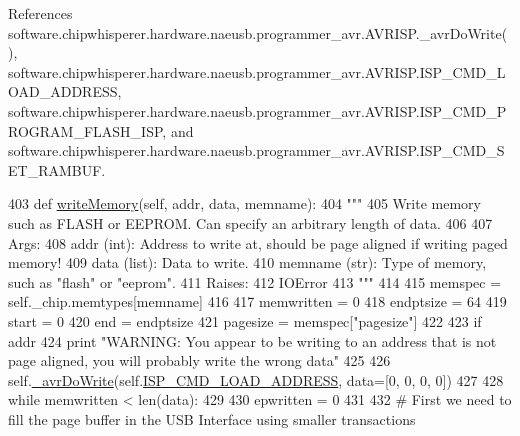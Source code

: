 References software.\+chipwhisperer.\+hardware.\+naeusb.\+programmer\+\_\+avr.\+A\+V\+R\+I\+S\+P.\+\_\+avr\+Do\+Write(), software.\+chipwhisperer.\+hardware.\+naeusb.\+programmer\+\_\+avr.\+A\+V\+R\+I\+S\+P.\+I\+S\+P\+\_\+\+C\+M\+D\+\_\+\+L\+O\+A\+D\+\_\+\+A\+D\+D\+R\+E\+S\+S, software.\+chipwhisperer.\+hardware.\+naeusb.\+programmer\+\_\+avr.\+A\+V\+R\+I\+S\+P.\+I\+S\+P\+\_\+\+C\+M\+D\+\_\+\+P\+R\+O\+G\+R\+A\+M\+\_\+\+F\+L\+A\+S\+H\+\_\+\+I\+S\+P, and software.\+chipwhisperer.\+hardware.\+naeusb.\+programmer\+\_\+avr.\+A\+V\+R\+I\+S\+P.\+I\+S\+P\+\_\+\+C\+M\+D\+\_\+\+S\+E\+T\+\_\+\+R\+A\+M\+B\+U\+F.


\begin{DoxyCode}
403     \textcolor{keyword}{def }\hyperlink{classsoftware_1_1chipwhisperer_1_1hardware_1_1naeusb_1_1programmer__avr_1_1AVRISP_a23ee0a22ef4d2d8e2222b4d7d99f7481}{writeMemory}(self, addr, data, memname):
404         \textcolor{stringliteral}{"""}
405 \textcolor{stringliteral}{        Write memory such as FLASH or EEPROM. Can specify an arbitrary length of data.}
406 \textcolor{stringliteral}{}
407 \textcolor{stringliteral}{        Args:}
408 \textcolor{stringliteral}{            addr (int): Address to write at, should be page aligned if writing paged memory!}
409 \textcolor{stringliteral}{            data (list): Data to write.}
410 \textcolor{stringliteral}{            memname (str): Type of memory, such as "flash" or "eeprom".}
411 \textcolor{stringliteral}{        Raises:}
412 \textcolor{stringliteral}{            IOError}
413 \textcolor{stringliteral}{        """}
414 
415         memspec = self.\_chip.memtypes[memname]
416 
417         memwritten = 0
418         endptsize = 64
419         start = 0
420         end = endptsize
421         pagesize = memspec[\textcolor{stringliteral}{"pagesize"}]
422 
423         \textcolor{keywordflow}{if} addr %
424             \textcolor{keywordflow}{print} \textcolor{stringliteral}{"WARNING: You appear to be writing to an address that is not page aligned, you will
       probably write the wrong data"}
425 
426         self.\hyperlink{classsoftware_1_1chipwhisperer_1_1hardware_1_1naeusb_1_1programmer__avr_1_1AVRISP_a30dde10a2adaa31bbd912b53bce2b138}{\_avrDoWrite}(self.\hyperlink{classsoftware_1_1chipwhisperer_1_1hardware_1_1naeusb_1_1programmer__avr_1_1AVRISP_a67f5e35e8a1fe59396fc6fcace808c56}{ISP\_CMD\_LOAD\_ADDRESS}, data=[0, 0, 0, 0])
427 
428         \textcolor{keywordflow}{while} memwritten < len(data):
429 
430             epwritten = 0
431 
432             \textcolor{comment}{# First we need to fill the page buffer in the USB Interface using smaller transactions}

\end{DoxyCode}
